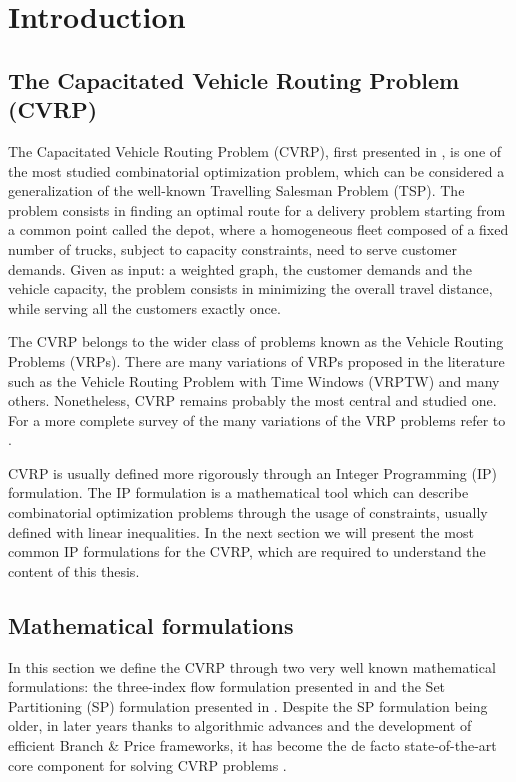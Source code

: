 \chapter{Introduction}

\section{The Capacitated Vehicle Routing Problem (CVRP)}
\label{sec:intro-cvrp-problem}

The Capacitated Vehicle Routing Problem (CVRP), first presented in \textcite{dantzig1959},
is one of the most studied combinatorial optimization problem,
which can be considered a generalization of the well-known Travelling Salesman Problem (TSP).
The problem consists in finding an optimal route for a delivery problem
starting from a common point called the depot,
where a homogeneous fleet composed of a fixed number of trucks, subject to capacity constraints,
need to serve customer demands.
Given as input: a weighted graph, the customer demands and the vehicle capacity,
the problem consists in minimizing the overall travel distance,
while serving all the customers exactly once.

The CVRP belongs to the wider class of problems known as the Vehicle Routing Problems (VRPs).
There are many variations of VRPs proposed in the literature such as
the Vehicle Routing Problem with Time Windows (VRPTW) and many others.
Nonetheless, CVRP remains probably the most central and studied one.
For a more complete survey of the many variations of the VRP problems refer to \cite{poggi2014}.


CVRP is usually defined more rigorously through an Integer Programming (IP) formulation.
The IP formulation is a mathematical tool which can describe combinatorial optimization problems
through the usage of constraints, usually defined with linear inequalities.
In the next section we will present the most common IP formulations for the CVRP, which
are required to understand the content of this thesis.

\section{Mathematical formulations}
\label{sec:intro-cvrp-mathematical-formulations}


In this section we define the CVRP through two very well known mathematical formulations:
the three-index flow formulation presented in \textcite{toth2002} and
the Set Partitioning (SP) formulation presented in \textcite{balinski1964}.
Despite the SP formulation being older, in later years thanks to algorithmic advances
and the development of efficient Branch \& Price frameworks, it has become the de facto
state-of-the-art core component for solving CVRP problems \parencite{pessoa2020}.


